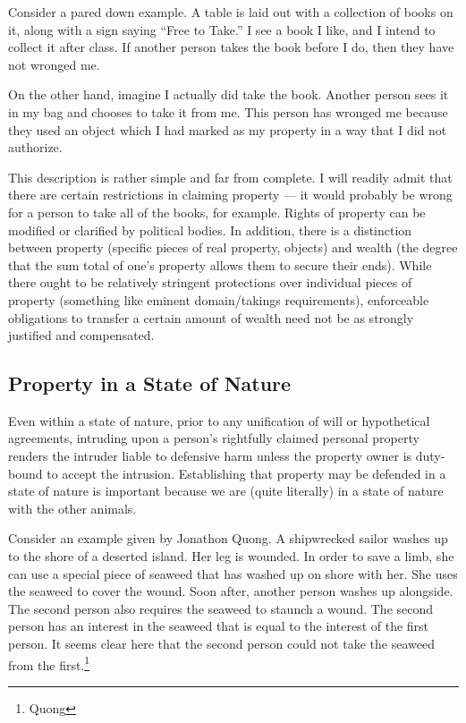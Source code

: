 	Consider a pared down example. A table is laid out with a collection of
	books on it, along with a sign saying “Free to Take.” I see a book I like,
	and I intend to collect it after class. If another person takes the book
	before I do, then they have not wronged me.

	On the other hand, imagine I actually did take the book. Another person
	sees it in my bag and chooses to take it from me. This person has wronged
	me because they used an object which I had marked as my property in a way
	that I did not authorize.

	This description is rather simple and far from complete. I will readily
	admit that there are certain restrictions in claiming property --- it would
	probably be wrong for a person to take all of the books, for example. Rights
	of property can be modified or clarified by political bodies. In addition,
	there is a distinction between property (specific pieces of real property,
	objects) and wealth (the degree that the sum total of one’s property allows
	them to secure their ends). While there ought to be relatively stringent
	protections over individual pieces of property (something like eminent
	domain/takings requirements), enforceable obligations to transfer a certain
	amount of wealth need not be as strongly justified and compensated.

	\subsection{Property in a State of Nature}

	Even within a state of nature, prior to any unification of will or
	hypothetical agreements, intruding upon a person’s rightfully claimed
	personal property renders the intruder liable to defensive harm unless the
	property owner is duty-bound to accept the intrusion.  Establishing that
	property may be defended in a state of nature is important because we are
	(quite literally) in a state of nature with the other animals. 

	Consider an example given by Jonathon Quong.  A shipwrecked sailor washes
	up to the shore of a deserted island. Her leg is wounded. In order to save
	a limb, she can use a special piece of seaweed that has washed up on shore
	with her. She uses the seaweed to cover the wound. Soon after, another
	person washes up alongside. The second person also requires the seaweed to
	staunch a wound. The second person has an interest in the seaweed that is
	equal to the interest of the first person. It seems clear here that the
	second person could not take the seaweed from the first.\footnote{Quong}

